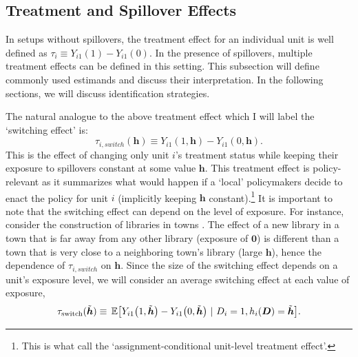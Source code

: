 \subsection{Treatment and Spillover Effects}

In setups without spillovers, the treatment effect for an individual unit is well defined as $\tau_i \equiv Y_{i1}(1) - Y_{i1}(0)$. In the presence of spillovers, multiple treatment effects can be defined in this setting. This subsection will define commonly used estimands and discuss their interpretation. In the following sections, we will discuss identification strategies.

The natural analogue to the above treatment effect which I will label the `switching effect' is:
\[
  \tau_{i, switch}(\bm{h}) \equiv Y_{i1}(1, \bm{h}) - Y_{i1}(0, \bm{h}).
\] 
This is the effect of changing only unit $i$'s treatment status while keeping their exposure to spillovers constant at some value $\bm{h}$. This treatment effect is policy-relevant as it summarizes what would happen if a `local' policymakers decide to enact the policy for unit $i$ (implicitly keeping $\bm{h}$ constant).\footnote{This is what \citet{savje2021average} call the `assignment-conditional unit-level treatment effect'.} It is important to note that the switching effect can depend on the level of exposure. For instance, consider the construction of libraries in towns \citep{berkes2021knowledge}. The effect of a new library in a town that is far away from any other library (exposure of $\bm{0}$) is different than a town that is very close to a neighboring town's library (large $\bm{h}$), hence the dependence of $\tau_{i, switch}$ on $\bm{h}$. Since the size of the switching effect depends on a unit's exposure level, we will consider an average switching effect at each value of exposure, 
\[
  \tau_{\text{switch}}(\tilde{\bm{h}}) \equiv 
  \expec{Y_{i1}\big( 1, \tilde{\bm{h}} \big) - Y_{i1}\big( 0, \tilde{\bm{h}} \big)}{D_i = 1, h_i(\bm{D}) = \tilde{\bm{h}}}.
\]

